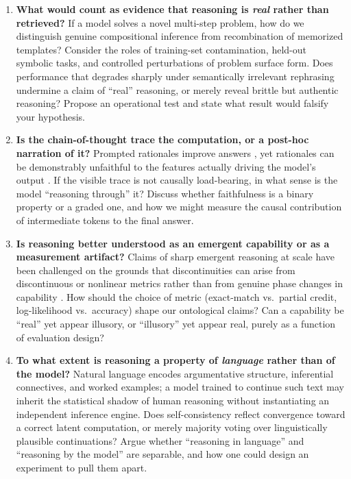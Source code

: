 \documentclass[11pt]{article}
\begin{document}
\begin{enumerate}[leftmargin=*,label=\textbf{Q\arabic*.}]

\item \textbf{What would count as evidence that reasoning is \emph{real} rather than retrieved?}
If a model solves a novel multi-step problem, how do we distinguish genuine compositional inference from recombination of memorized templates? Consider the roles of training-set contamination, held-out symbolic tasks, and controlled perturbations of problem surface form. Does performance that degrades sharply under semantically irrelevant rephrasing \citep{srivastava2023beyond} undermine a claim of ``real'' reasoning, or merely reveal brittle but authentic reasoning? Propose an operational test and state what result would falsify your hypothesis.

\item \textbf{Is the chain-of-thought trace the computation, or a post-hoc narration of it?}
Prompted rationales improve answers \citep{wei2022chain}, yet rationales can be demonstrably unfaithful to the features actually driving the model's output \citep{turpin2023language}. If the visible trace is not causally load-bearing, in what sense is the model ``reasoning through'' it? Discuss whether faithfulness is a binary property or a graded one, and how we might measure the causal contribution of intermediate tokens to the final answer.

\item \textbf{Is reasoning better understood as an emergent capability or as a measurement artifact?}
Claims of sharp emergent reasoning at scale have been challenged on the grounds that discontinuities can arise from discontinuous or nonlinear metrics rather than from genuine phase changes in capability \citep{schaeffer2023emergent}. How should the choice of metric (exact-match vs.\ partial credit, log-likelihood vs.\ accuracy) shape our ontological claims? Can a capability be ``real'' yet appear illusory, or ``illusory'' yet appear real, purely as a function of evaluation design?

\item \textbf{To what extent is reasoning a property of \emph{language} rather than of the model?}
Natural language encodes argumentative structure, inferential connectives, and worked examples; a model trained to continue such text may inherit the statistical shadow of human reasoning without instantiating an independent inference engine. Does self-consistency \citep{wang2022selfconsistency} reflect convergence toward a correct latent computation, or merely majority voting over linguistically plausible continuations? Argue whether ``reasoning in language'' and ``reasoning by the model'' are separable, and how one could design an experiment to pull them apart.


\end{enumerate}
\end{document}
